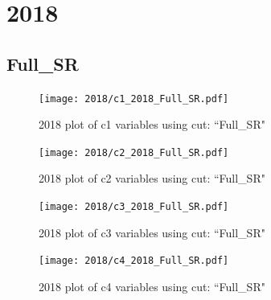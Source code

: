 \documentclass{article}
\begin{document}
    \section*{2018}
      \subsection*{Full\_SR}
                        \begin{figure}[H]
                            \centering
                            \caption{2018 plot of c1 variables using cut: ``Full\_SR"}
                            \texttt{[image: 2018/c1\_2018\_Full\_SR.pdf]}
                        \end{figure}    
                        \begin{figure}[H]
                            \centering
                            \caption{2018 plot of c2 variables using cut: ``Full\_SR"}
                            \texttt{[image: 2018/c2\_2018\_Full\_SR.pdf]}
                        \end{figure}    
                        \begin{figure}[H]
                            \centering
                            \caption{2018 plot of c3 variables using cut: ``Full\_SR"}
                            \texttt{[image: 2018/c3\_2018\_Full\_SR.pdf]}
                        \end{figure}    
                        \begin{figure}[H]
                            \centering
                            \caption{2018 plot of c4 variables using cut: ``Full\_SR"}
                            \texttt{[image: 2018/c4\_2018\_Full\_SR.pdf]}
                        \end{figure}    
\end{document}
